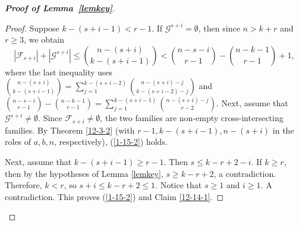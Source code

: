 \documentclass[11pt]{article}
\newcommand{\m}{\mathcal}
\begin{document}
\begin{proof}[{\bf Proof of Lemma~\ref{lemkey}}]
\begin{proof}
Suppose $k-(s+i-1)<r-1$. 
If $\m G^{s+i}=\emptyset$, then since $n>k+r$ and $r\ge 3$, we obtain
\[
|\mathcal{F}_{s+i}|+|\mathcal{G}^{s+i}|\le {n-(s+i)\choose k-(s+i-1)}< {n-s-i\choose r-1}-{n-k-1\choose r-1}+1,
\]
where the last inequality uses ${n-(s+i)\choose k-(s+i-1)}=\sum_{j=1}^{k-(s+i-2)}{n-(s+i)-j\choose k-(s+i-2)-j}$ and ${n-s-i\choose r-1}-{n-k-1\choose r-1}=\sum_{j=1}^{k-(s+i-1)}{n-(s+i)-j\choose r-2}$.
Next, assume that $\m G^{s+i}\ne \emptyset$. Since $\m F_{s+i}\ne \emptyset$, the two families are non-empty cross-intersecting families. By Theorem \ref{12-3-2} (with $r-1,k-(s+i-1),n-(s+i)$ in the roles of $a,b,n$, respectively), (\ref{1-15-2}) holds. 

Next, assume that $k-(s+i-1)\ge r-1$. Then $s\le k-r+2-i$. 
If $k\ge r$, then by the hypotheses of Lemma \ref{lemkey}, 
$s\ge k-r+2$, a contradiction. Therefore,  $k<r$, so $s+i\le k-r+2\le 1$. Notice that $s\ge 1$ and $i\ge 1$.  
A contradiction. This proves (\ref{1-15-2}) and Claim \ref{12-14-1}.
\end{proof}




\end{proof}
\end{document}
